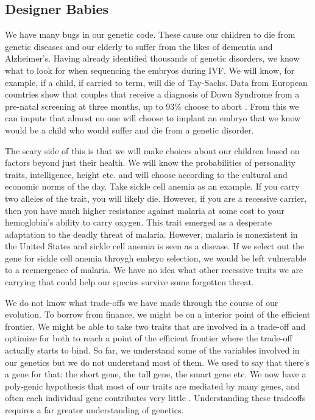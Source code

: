 \subsection{Designer Babies}

We have many bugs in our genetic code.
These cause our children to die from genetic diseases and our elderly to suffer from the likes of dementia and Alzheimer's.
Having already identified thousands of genetic disorders, we know what to look for when sequencing the embryos during IVF.
We will know, for example, if a child, if carried to term, will die of Tay-Sachs.
Data from European countries show that couples that receive a diagnosis of Down Syndrome from a pre-natal screening at three months, up to 93\% choose to abort \cite{Natoli2012}.
From this we can impute that almost no one will choose to implant an embryo that we know would be a child who would suffer and die from a genetic disorder.

The scary side of this is that we will make choices about our children based on factors beyond just their health.
We will know the probabilities of personality traits, intelligence, height etc. and will choose according to the cultural and economic norms of the day.
Take sickle cell anemia as an example.
If you carry two alleles of the trait, you will likely die.
However, if you are a recessive carrier, then you have much higher resistance against malaria at some cost to your hemoglobin's ability to carry oxygen.
This trait emerged as a desperate adaptation to the deadly threat of malaria.
However, malaria is nonexistent in the United States and sickle cell anemia is seen as a disease.
If we select out the gene for sickle cell anemia throygh embryo selection, we would be left vulnerable to a reemergence of malaria.
We have no idea what other recessive traits we are carrying that could help our species survive some forgotten threat.

We do not know what trade-offs we have made through the course of our evolution.
To borrow from finance, we might be on a interior point of the efficient frontier.
We might be able to take two traits that are involved in a trade-off and optimize for both to reach a point of the efficient frontier where the trade-off actually starts to bind.
So far, we understand some of the variables involved in our genetics but we do not understand most of them.
We used to say that there's a gene for that: the short gene, the tall gene, the smart gene etc.
We now have a poly-genic hypothesis that most of our traits are mediated by many genes, and often each individual gene contributes very little \cite{polygenic2016}.
Understanding these tradeoffs requires a far greater understanding of genetics.


